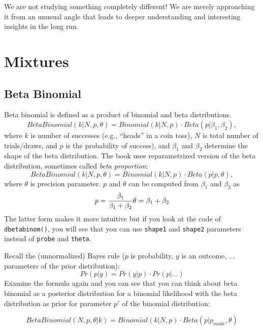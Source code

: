 \documentclass[
]{book}
\begin{document}
We are not studying something completely different! We are merely approaching it from an unusual angle that leads to deeper understanding and interesting insights in the long run.

\hypertarget{mixtures}{%
\chapter{Mixtures}\label{mixtures}}

\hypertarget{beta-binomial}{%
\section{Beta Binomial}\label{beta-binomial}}

Beta binomial is defined as a product of binomial and beta distributions.
\[BetaBinomial(k|N, p, \theta) = Binomial(k|N,p) \cdot Beta(p|\beta_1, \beta_2),\]
where \(k\) is number of successes (e.g., ``heads'' in a coin toss), \(N\) is total number of trials/draws, and \(p\) is the probability of success), and \(\beta_1\) and \(\beta_2\) determine the shape of the beta distribution. The book uses reparametrized version of the beta distribution, sometimes called \emph{beta proportion}:
\[BetaBinomial(k|N, p, \theta) = Binomial(k|N,p) \cdot Beta(p|p, \theta),\]
where \(\theta\) is precision parameter. \(p\) and \(\theta\) can be computed from \(\beta_1\) and \(\beta_2\) as
\[
p = \frac{\beta_1}{\beta_1 + \beta_2}\\
\theta = \beta_1 + \beta_2
\]
The latter form makes it more intuitive but if you look at the code of \texttt{dbetabinom()}, you will see that you can use \texttt{shape1} and \texttt{shape2} parameters instead of \texttt{probe} and \texttt{theta}.

Recall the (unnormalized) Bayes rule (\(p\) is probability, \(y\) is an outcome, \(...\) parameters of the prior distribution):
\[
Pr(p | y) = Pr(y | p) \cdot Pr(p | ...)
\]
Examine the formula again and you can see that you can think about beta binomial as a posterior distribution for a binomial likelihood with the beta distribution as prior for parameter \(p'\) of the binomial distribution:

\[BetaBinomial(N, p, \theta | k) = Binomial(k|N,p) \cdot Beta(p| p_{mode}, \theta)\]
\end{document}
